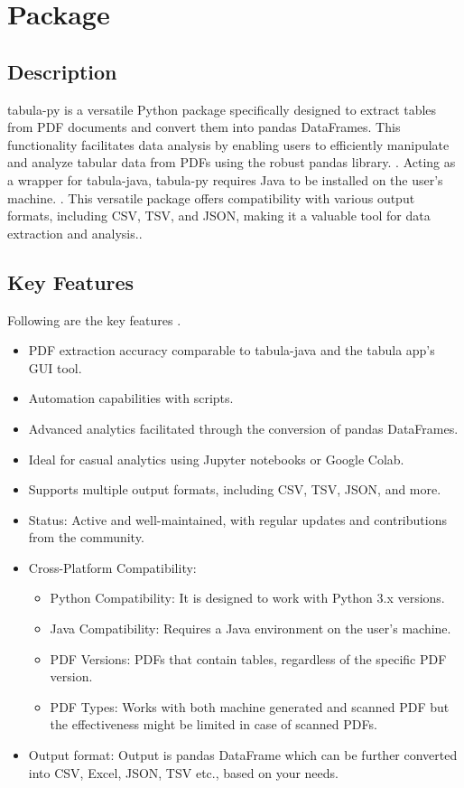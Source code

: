 \chapter{Package }

\section{Description}

tabula-py is a versatile Python package specifically designed to extract tables from PDF documents and convert them into pandas DataFrames. This functionality facilitates data analysis by enabling users to efficiently manipulate and analyze tabular data from PDFs using the robust pandas library. \cite{Ariga:2024}. Acting as a wrapper for tabula-java, tabula-py requires Java to be installed on the user's machine. \cite{Ariga:2024}. This versatile package offers compatibility with various output formats, including CSV, TSV, and JSON, making it a valuable tool for data extraction and analysis.\cite{Ariga:2024}.


\section{Key Features}

Following are the key features \cite{Ariga:2024}.

\begin{itemize}
    \item PDF extraction accuracy comparable to tabula-java and the tabula app's GUI tool.
    \item Automation capabilities with  scripts.
    \item Advanced analytics facilitated through the conversion of pandas DataFrames.
    \item Ideal for casual analytics using Jupyter notebooks or Google Colab.
    \item Supports multiple output formats, including CSV, TSV, JSON, and more.
    \item Status: Active and well-maintained, with regular updates and contributions from the community.
    \item Cross-Platform Compatibility: 
    \begin{itemize}
    \item Python Compatibility: It is designed to work with Python 3.x versions.
    \item Java Compatibility: Requires a Java environment on the user's machine.
    \item PDF Versions: PDFs that contain tables, regardless of the specific PDF version.
    \item PDF Types: Works with both machine generated and scanned PDF but the effectiveness might be limited in case of scanned PDFs. 
    \end{itemize}
    \item Output format: Output is pandas DataFrame which can be further converted into CSV, Excel, JSON, TSV etc., based on your needs.
\end{itemize}

